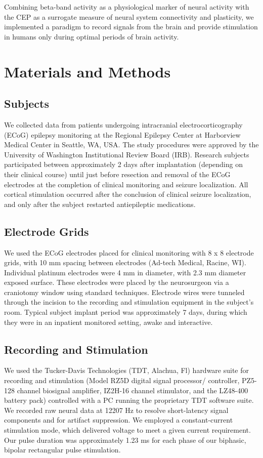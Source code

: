 Combining beta-band activity as a physiological marker of neural activity with the CEP as a surrogate measure of neural system connectivity and plasticity, we implemented a paradigm to record signals from the brain and provide stimulation in humans only during optimal periods of brain activity. 

\section{Materials and Methods}
\subsection{Subjects}
We collected data from patients undergoing intracranial electrocorticography (ECoG) epilepsy monitoring at the Regional Epilepsy Center at Harborview Medical Center in Seattle, WA, USA. The study procedures were approved by the University of Washington Institutional Review Board (IRB). Research subjects participated between approximately 2 days after implantation (depending on their clinical course) until just before resection and removal of the ECoG electrodes at the completion of clinical monitoring and seizure localization. All cortical stimulation occurred after the conclusion of clinical seizure localization, and only after the subject restarted antiepileptic medications.

\subsection{Electrode Grids}
We used the ECoG electrodes placed for clinical monitoring with 8 x 8 electrode grids, with 10 mm spacing between electrodes (Ad-tech Medical, Racine, WI). Individual platinum electrodes were 4 mm in diameter, with 2.3 mm diameter exposed surface. These electrodes were placed by the neurosurgeon via a craniotomy window using standard techniques. Electrode wires were tunneled through the incision to the recording and stimulation equipment in the subject’s room. Typical subject implant period was approximately 7 days, during which they were in an inpatient monitored setting, awake and interactive. 

\subsection{Recording and Stimulation}
We used the Tucker-Davis Technologies (TDT, Alachua, Fl) hardware suite for recording and stimulation (Model RZ5D digital signal processor/ controller, PZ5-128 channel biosignal amplifier, IZ2H-16 channel stimulator, and the LZ48-400 battery pack) controlled with a PC running the proprietary TDT software suite.  We recorded raw neural data at 12207 Hz to resolve short-latency signal components and for artifact suppression. We employed a constant-current stimulation mode, which delivered voltage to meet a given current requirement. Our pulse duration was approximately 1.23 ms for each phase of our biphasic, bipolar rectangular pulse stimulation. 

